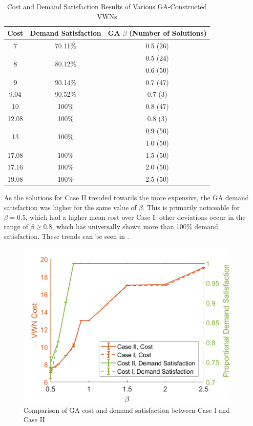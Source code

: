 \documentclass[12pt,dvipsnames]{report}
\begin{document}
\begin{table}[htp]
	\centering
	\caption[Cost and Demand Satisfaction Results of Various GA-Constructed VWNs for Case II]{Cost and Demand Satisfaction Results of Various GA-Constructed VWNs}
	\begin{tabular}{|c|c|c|} 
		\hline
		\textbf{Cost} & \textbf{Demand Satisfaction} & \textbf{GA $\beta$ (Number of Solutions)} \\
		\hline
		7 & 70.11\% & 0.5 (26) \\
		\hline
		\multirow{2}{*}{8} & \multirow{2}{*}{80.12\%} & 0.5 (24)\\
		& & 0.6 (50) \\
		\hline
		9 & 90.14\% & 0.7 (47) \\
		\hline
		9.04 & 90.52\% & 0.7 (3) \\
		\hline
		10 & 100\% & 0.8 (47) \\
		\hline
		12.08 & 100\% & 0.8 (3) \\
		\hline
		\multirow{2}{*}{13} & \multirow{2}{*}{100\%} & 0.9 (50) \\
		& & 1.0 (50) \\
		\hline
		17.08 & 100\% & 1.5 (50) \\
		\hline
		17.16 & 100\% & 2.0 (50) \\
		\hline
		19.08 & 100\% & 2.5 (50) \\
		\hline
	\end{tabular}
	\label{tab:CaseII_ComparisonCostSat}
\end{table}

As the solutions for Case II trended towards the more expensive, the GA demand satisfaction was higher for the same value of $\beta$.  This is primarily noticeable for $\beta = 0.5$, which had a higher mean cost over Case I; other deviations occur in the range of $\beta \geq 0.8$, which has universally shown more than 100\% demand satisfaction.  These trends can be seen in .

\begin{figure}[htp]
	\centering
	\includegraphics[height=0.4\textheight]{Figures/CaseII_GAComparisonCostSatCaseI}
	\caption{Comparison of GA cost and demand satisfaction between Case I and Case II}
	\label{fig:CaseII_GAComparisonCostSatCaseI}
\end{figure}
\end{document}

